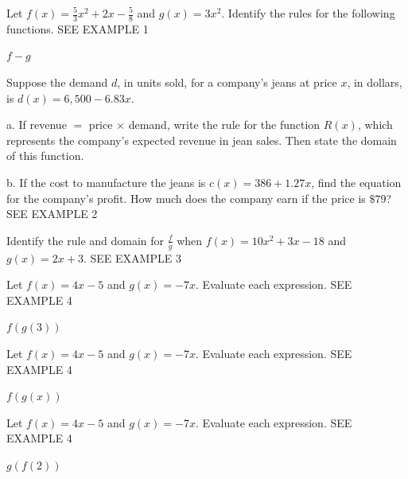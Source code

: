 \documentclass{article}
\newenvironment{practice}[2]{}{}        %
\newcommand{\answer}[1]{}               %
\begin{document}
\begin{practice}{21}{1}
Let \(f(x)=\frac{5}{3}x^2+2x-\frac{5}{8}\) and \(g(x)=3x^2\). Identify the rules for the following functions. SEE EXAMPLE 1

\(f-g\)

\answer{\(f-g=-\frac{4}{3}x^2+2x-\frac{5}{8}\).}
\end{practice}

\begin{practice}{22}{2}
Suppose the demand \(d\), in units sold, for a company's jeans at price \(x\), in dollars, is \(d(x)=6{,}500-6.83x\).

a. If revenue \(=\) price \(\times\) demand, write the rule for the function \(R(x)\), which represents the company's expected revenue in jean sales. Then state the domain of this function.

b. If the cost to manufacture the jeans is \(c(x)=386+1.27x\), find the equation for the company's profit. How much does the company earn if the price is \(\$79\)? SEE EXAMPLE 2

\answer{a. \(R(x)=6{,}500x-6.83x^2\) for \(0\le x\le 951.68\). b. \(P(x)=-6.83x^2+6{,}498.73x-386\); \(P(79)=\$470{,}387.64\).}
\end{practice}

\begin{practice}{23}{1}
Identify the rule and domain for \(\frac{f}{g}\) when \(f(x)=10x^2+3x-18\) and \(g(x)=2x+3\). SEE EXAMPLE 3

\answer{\(\left(\frac{f}{g}\right)(x)=5x-6\) for all real numbers \(x\), such that \(x\ne -\frac{3}{2}\).}
\end{practice}

\begin{practice}{24}{1}
Let \(f(x)=4x-5\) and \(g(x)=-7x\). Evaluate each expression. SEE EXAMPLE 4

\(f(g(3))\)

\answer{\(-89\).}
\end{practice}

\begin{practice}{25}{1}
Let \(f(x)=4x-5\) and \(g(x)=-7x\). Evaluate each expression. SEE EXAMPLE 4

\(f(g(x))\)

\answer{\(-28x-5\).}
\end{practice}

\begin{practice}{26}{1}
Let \(f(x)=4x-5\) and \(g(x)=-7x\). Evaluate each expression. SEE EXAMPLE 4

\(g(f(2))\)

\answer{\(-21\).}
\end{practice}
\end{document}
